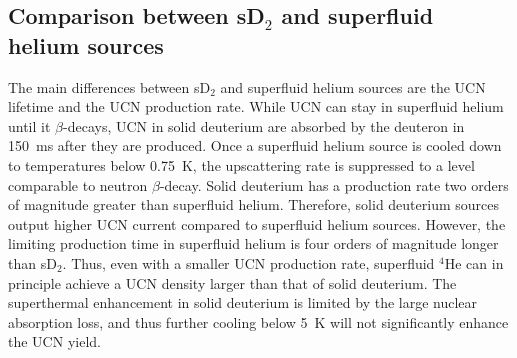

\subsection{Comparison between sD$_2$ and superfluid helium sources}

The main differences between sD$_2$ and superfluid helium sources are
the UCN lifetime and the UCN production rate. While UCN can stay in
superfluid helium until it $\beta$-decays, UCN in solid deuterium are
absorbed by the deuteron in 150~ms after they are produced.  Once a
superfluid helium source is cooled down to temperatures below 0.75~K,
the upscattering rate is suppressed to a level comparable to neutron
$\beta$-decay.  Solid deuterium has a production rate two orders of
magnitude greater than superfluid helium. Therefore, solid deuterium
sources output higher UCN current compared to superfluid helium
sources. However, the limiting production time in superfluid helium is
four orders of magnitude longer than sD$_2$. Thus, even with a smaller
UCN production rate, superfluid $^4$He can in principle achieve a UCN
density larger than that of solid deuterium.  The superthermal
enhancement in solid deuterium is limited by the large nuclear
absorption loss, and thus further cooling below 5~K will not
significantly enhance the UCN yield.








